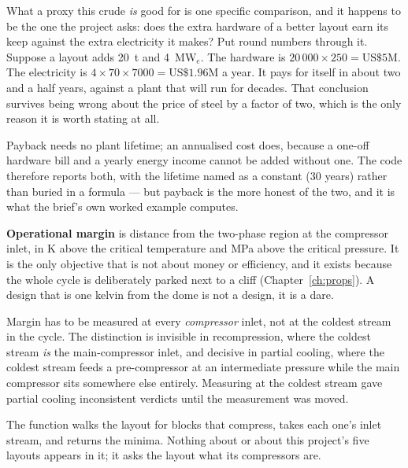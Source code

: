 \documentclass[11pt,a4paper]{report}
\begin{document}
What a proxy this crude \emph{is} good for is one specific comparison, and
it happens to be the one the project asks: does the extra hardware of a
better layout earn its keep against the extra electricity it makes? Put
round numbers through it. Suppose a layout adds \SI{20}{\tonne} and
\SI{4}{\mega\watt}$_e$. The hardware is $20\,000 \times 250 = \text{US\$5M}$. The electricity is $4 \times 70 \times 7000 = \text{US\$1.96M}$ a year. It pays for itself in about two and a half
years, against a plant that will run for decades. That conclusion survives
being wrong about the price of steel by a factor of two, which is the only
reason it is worth stating at all.

\begin{caveat}
Payback needs no plant lifetime; an annualised cost does, because a one-off
hardware bill and a yearly energy income cannot be added without one. The
code therefore reports both, with the lifetime named as a constant
(\num{30} years) rather than buried in a formula --- but payback is the more
honest of the two, and it is what the brief's own worked example computes.
\end{caveat}

\textbf{Operational margin} is distance from the two-phase region at the
compressor inlet, in \si{\kelvin} above the critical temperature and
\si{\mega\pascal} above the critical pressure. It is the only objective that
is not about money or efficiency, and it exists because the whole cycle is
deliberately parked next to a cliff (Chapter~\ref{ch:props}). A design that
is one kelvin from the dome is not a design, it is a dare.

\begin{choicebox}[title={Implementation: which inlet}]
Margin has to be measured at every \emph{compressor} inlet, not at the
coldest stream in the cycle. The distinction is invisible in recompression,
where the coldest stream \emph{is} the main-compressor inlet, and decisive in
partial cooling, where the coldest stream feeds a pre-compressor at an
intermediate pressure while the main compressor sits somewhere else entirely.
Measuring at the coldest stream gave partial cooling inconsistent verdicts
until the measurement was moved.


The function walks the layout for blocks that compress, takes each one's
inlet stream, and returns the minima. Nothing about  or about this
project's five layouts appears in it; it asks the layout what its
compressors are.
\end{choicebox}
\end{document}
